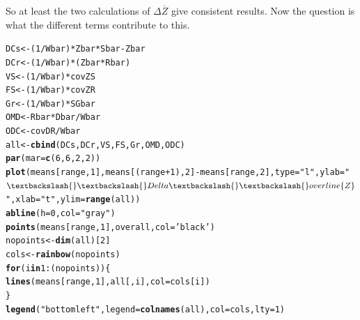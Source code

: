 \documentclass{article}\usepackage[]{graphicx}\usepackage[]{color}
\makeatletter
\newcommand{\hlnum}[1]{\textcolor[rgb]{0.686,0.059,0.569}{#1}}%
\newcommand{\hlstr}[1]{\textcolor[rgb]{0.192,0.494,0.8}{#1}}%
\newcommand{\hlopt}[1]{\textcolor[rgb]{0,0,0}{#1}}%
\newcommand{\hlstd}[1]{\textcolor[rgb]{0.345,0.345,0.345}{#1}}%
\newcommand{\hlkwa}[1]{\textcolor[rgb]{0.161,0.373,0.58}{\textbf{#1}}}%
\newcommand{\hlkwb}[1]{\textcolor[rgb]{0.69,0.353,0.396}{#1}}%
\newcommand{\hlkwc}[1]{\textcolor[rgb]{0.333,0.667,0.333}{#1}}%
\newcommand{\hlkwd}[1]{\textcolor[rgb]{0.737,0.353,0.396}{\textbf{#1}}}%
\newenvironment{kframe}{%
 \def\at@end@of@kframe{}%
 \ifinner\ifhmode%
  \def\at@end@of@kframe{\end{minipage}}%
  \begin{minipage}{\columnwidth}%
 \fi\fi%
 \def\FrameCommand##1{\hskip\@totalleftmargin \hskip-\fboxsep
 \colorbox{shadecolor}{##1}\hskip-\fboxsep
     \hskip-\linewidth \hskip-\@totalleftmargin \hskip\columnwidth}%
 \MakeFramed {\advance\hsize-\width
   \@totalleftmargin\z@ \linewidth\hsize
   \@setminipage}}%
 {\par\unskip\endMakeFramed%
 \at@end@of@kframe}
\newenvironment{knitrout}{}{} %
\makeatother
\begin{document}
So at least the two calculations of $\Delta \overline{Z}$ give consistent results. Now the question is what the different terms contribute to this.
\begin{knitrout}
\color{fgcolor}\begin{kframe}
\begin{alltt}
\hlstd{DCs}\hlkwb{<-}\hlstd{(}\hlnum{1}\hlopt{/}\hlstd{Wbar)}\hlopt{*}\hlstd{Zbar}\hlopt{*}\hlstd{Sbar}\hlopt{-}\hlstd{Zbar}
\hlstd{DCr}\hlkwb{<-}\hlstd{(}\hlnum{1}\hlopt{/}\hlstd{Wbar)}\hlopt{*}\hlstd{(Zbar}\hlopt{*}\hlstd{Rbar)}
\hlstd{VS}\hlkwb{<-}\hlstd{(}\hlnum{1}\hlopt{/}\hlstd{Wbar)}\hlopt{*}\hlstd{covZS}
\hlstd{FS}\hlkwb{<-}\hlstd{(}\hlnum{1}\hlopt{/}\hlstd{Wbar)}\hlopt{*}\hlstd{covZR}
\hlstd{Gr}\hlkwb{<-}\hlstd{(}\hlnum{1}\hlopt{/}\hlstd{Wbar)}\hlopt{*}\hlstd{SGbar}
\hlstd{OMD}\hlkwb{<-}\hlstd{Rbar}\hlopt{*}\hlstd{Dbar}\hlopt{/}\hlstd{Wbar}
\hlstd{ODC}\hlkwb{<-}\hlstd{covDR}\hlopt{/}\hlstd{Wbar}
\hlstd{all}\hlkwb{<-}\hlkwd{cbind}\hlstd{(DCs,DCr,VS,FS,Gr,OMD,ODC)}
\hlkwd{par}\hlstd{(}\hlkwc{mar}\hlstd{=}\hlkwd{c}\hlstd{(}\hlnum{6}\hlstd{,}\hlnum{6}\hlstd{,}\hlnum{2}\hlstd{,}\hlnum{2}\hlstd{))}
\hlkwd{plot}\hlstd{(means[range,}\hlnum{1}\hlstd{],means[(range}\hlopt{+}\hlnum{1}\hlstd{),}\hlnum{2}\hlstd{]}\hlopt{-}\hlstd{means[range,}\hlnum{2}\hlstd{],}\hlkwc{type}\hlstd{=}\hlstr{"l"}\hlstd{,}\hlkwc{ylab}\hlstd{=}\hlstr{"$\textbackslash{}\textbackslash{}Delta \textbackslash{}\textbackslash{}overline\{Z\}$"}\hlstd{,}\hlkwc{xlab}\hlstd{=}\hlstr{"t"}\hlstd{,}\hlkwc{ylim}\hlstd{=}\hlkwd{range}\hlstd{(all))}
\hlkwd{abline}\hlstd{(}\hlkwc{h}\hlstd{=}\hlnum{0}\hlstd{,}\hlkwc{col}\hlstd{=}\hlstr{"gray"}\hlstd{)}
\hlkwd{points}\hlstd{(means[range,}\hlnum{1}\hlstd{],overall,}\hlkwc{col}\hlstd{=}\hlstr{'black'}\hlstd{)}
\hlstd{nopoints}\hlkwb{<-}\hlkwd{dim}\hlstd{(all)[}\hlnum{2}\hlstd{]}
\hlstd{cols}\hlkwb{<-}\hlkwd{rainbow}\hlstd{(nopoints)}
\hlkwa{for}\hlstd{(i} \hlkwa{in} \hlnum{1}\hlopt{:}\hlstd{(nopoints))\{}
\hlkwd{lines}\hlstd{(means[range,}\hlnum{1}\hlstd{],all[,i],}\hlkwc{col}\hlstd{=cols[i])}
\hlstd{\}}
\hlkwd{legend}\hlstd{(}\hlstr{"bottomleft"}\hlstd{,}\hlkwc{legend}\hlstd{=}\hlkwd{colnames}\hlstd{(all),}\hlkwc{col}\hlstd{=cols,}\hlkwc{lty}\hlstd{=}\hlnum{1}\hlstd{)}
\end{alltt}
\end{kframe}

\end{knitrout}
\end{document}
